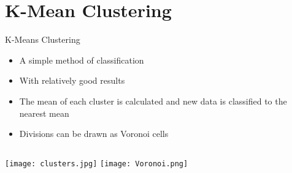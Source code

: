 \documentclass{beamer}
\begin{document}
\section[K-Means]{K-Mean Clustering}

\begin{frame}{K-Means Clustering}
	\begin{itemize}
		\item A simple method of classification
		\item[] With relatively good results
		\item The mean of each cluster is calculated and new data is classified to the nearest mean
		\item Divisions can be drawn as Voronoi cells
	\end{itemize}
	\begin{columns}
		\texttt{[image: clusters.jpg]}
		\texttt{[image: Voronoi.png]}
	\end{columns}	
\end{frame}
\end{document}
